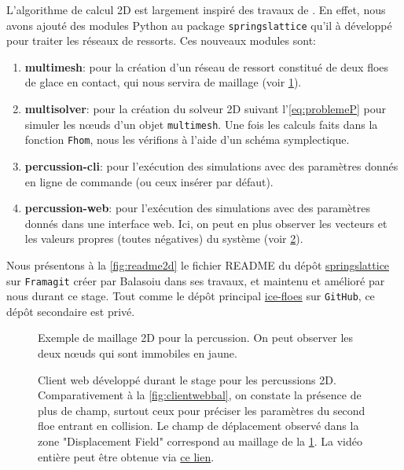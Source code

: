 L'algorithme de calcul 2D est largement inspiré des travaux de \citeauthor{balasoiu2020halthesis}. En effet, nous avons ajouté des modules Python au package \texttt{springslattice} qu'il à développé pour traiter les réseaux de ressorts. Ces nouveaux modules sont:
\begin{enumerate}
    \item \textbf{multimesh}: pour la création d'un réseau de ressort constitué de deux floes de glace en contact, qui nous servira de maillage (voir \cref{fig:percussion2d}).
    \item \textbf{multisolver}: pour la création du solveur 2D suivant l'\cref{eq:problemeP} pour simuler les n\oe{}uds d'un objet \texttt{multimesh}. Une fois les calculs faits dans la fonction \texttt{Fhom}, nous les vérifions à l'aide d'un schéma symplectique.
    \item \textbf{percussion-cli}: pour l'exécution des simulations avec des paramètres donnés en ligne de commande (ou ceux insérer par défaut).
    \item \textbf{percussion-web}: pour l'exécution des simulations avec des paramètres donnés dans une interface web. Ici, on peut en plus observer les vecteurs et les valeurs propres (toutes négatives) du système (voir \cref{fig:clientwebmoi}).
\end{enumerate}


Nous présentons à la \cref{fig:readme2d} le fichier README du dépôt \href{https://framagit.org/RaK/SimuRessorts}{springslattice} sur \texttt{Framagit} créer par Balasoiu dans ses travaux, et maintenu et amélioré par nous durant ce stage. Tout comme le dépôt principal \href{https://github.com/desmond-rn/ice-floes}{ice-floes} sur \texttt{GitHub}, ce dépôt secondaire est privé.



\begin{figure}[H]
    \centering
    \caption{Exemple de maillage 2D pour la percussion. On peut observer les deux n\oe{}uds qui sont immobiles en jaune.}
    \label{fig:percussion2d}
\end{figure}


\begin{figure}[H]
    \centering
    \caption{Client web développé durant le stage pour les percussions 2D. Comparativement à la \cref{fig:clientwebbal}, on constate la présence de plus de champ, surtout ceux pour préciser les paramètres du second floe entrant en collision. Le champ de déplacement observé dans la zone "Displacement Field" correspond au maillage de la \cref{fig:percussion2d}. La vidéo entière peut être obtenue via \href{https://seafile.unistra.fr/f/5e9baa748e89426eb017/}{ce lien}.}
    \label{fig:clientwebmoi}
\end{figure}



